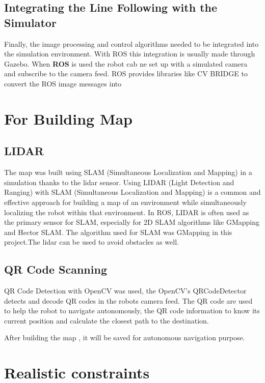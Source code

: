 \documentclass[../../main]{subfiles}
\begin{document}
    \subsection{Integrating the Line Following with the Simulator}
    
    Finally, the image processing and control algorithms needed to be
    integrated into the simulation environment. With ROS this integration is
    usually made through Gazebo. When \textbf{ROS} is used the robot cab ne
    set up with a simulated camera and subscribe to the camera feed. ROS
    provides libraries like CV BRIDGE to convert the ROS image messages into
    
    \section{For Building Map}
    
    \subsection{LIDAR}
    
    The map was built using SLAM (Simultaneous Localization and Mapping) in
    a simulation thanks to the lidar sensor. Using LIDAR (Light Detection
    and Ranging) with SLAM (Simultaneous Localization and Mapping) is a
    common and effective approach for building a map of an environment while
    simultaneously localizing the robot within that environment. In ROS,
    LIDAR is often used as the primary sensor for SLAM, especially for 2D
    SLAM algorithms like GMapping and Hector SLAM. The algorithm used for
    SLAM was GMapping in this project.The lidar can be used to avoid
    obstacles as well.
    
    \subsection{QR Code Scanning}
    
    QR Code Detection with OpenCV was used, the OpenCV's QRCodeDetector
    detects and decode QR codes in the robot\textquotesingle s camera feed.
    The QR code are used to help the robot to navigate autonomously, the QR
    code information to know its current position and calculate the closest
    path to the destination.
    
    After building the map , it will be saved for autonomous navigation
    purpose.
    
      \section{Realistic constraints}
    
\end{document}
